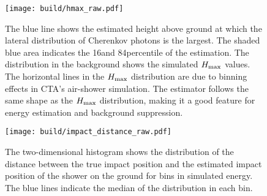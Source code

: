 \begin{figure}
    \centering
    \texttt{[image: build/hmax\_raw.pdf]}
    \caption[Max height reconstruction accuracy.]{The blue line shows the estimated height above ground at which the lateral distribution of Cherenkov photons is the largest. 
    The shaded blue area indicates the 16\th and 84\th percentile of the estimation.
    The distribution in the background shows the simulated $H_\text{max}$ values. The horizontal lines in the $H_\text{max}$ distribution are due to binning effects 
    in CTA's air-shower simulation.  The estimator follows the same shape as the $H_\text{max}$ 
    distribution, making it a good feature for energy estimation and background suppression.
    }
    \label{fig:hmax_raw}
\end{figure}
\begin{figure}
    \centering
    \texttt{[image: build/impact\_distance\_raw.pdf]}
    \caption[Reconstruction of the impact distance]{The two-dimensional histogram shows the distribution of the distance between the true impact position and 
    the estimated impact position of the shower on the ground for bins in simulated energy.
    The blue lines indicate the median of the distribution in each bin.
    }
    \label{fig:impact_distance_raw}
\end{figure}


